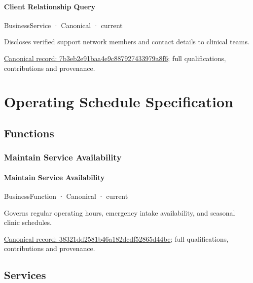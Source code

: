 \paragraph{Client Relationship Query}

\label{element:7b3eb2e91baa4e9c887927433979a8f6}
{\small BusinessService · Canonical · current}\par

Discloses verified support network members and contact details to clinical teams.


{\footnotesize \href{../../../../continuum/business/business-service/7b3eb2e91baa4e9c887927433979a8f6.md}{Canonical record: 7b3eb2e91baa4e9c887927433979a8f6}; full qualifications, contributions and provenance.}\par
\section{Operating Schedule Specification}

\subsection{Functions}

\subsubsection{Maintain Service Availability}

\paragraph{Maintain Service Availability}

\label{element:38321dd2581b46a182dcdf52865d44be}
{\small BusinessFunction · Canonical · current}\par

Governs regular operating hours, emergency intake availability, and seasonal clinic schedules.


{\footnotesize \href{../../../../continuum/business/business-function/38321dd2581b46a182dcdf52865d44be.md}{Canonical record: 38321dd2581b46a182dcdf52865d44be}; full qualifications, contributions and provenance.}\par
\subsection{Services}

